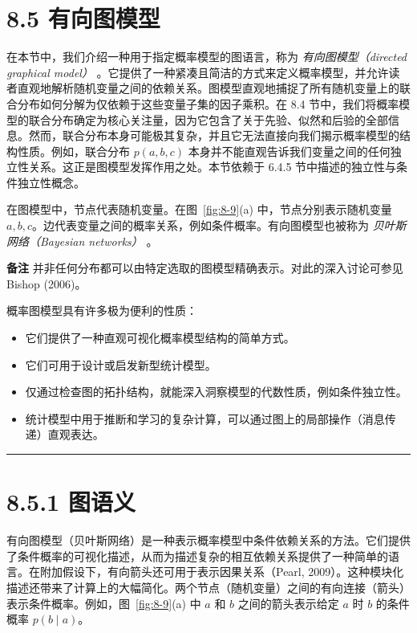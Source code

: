 \section*{8.5 有向图模型}
\label{sec:8.5}

在本节中，我们介绍一种用于指定概率模型的图语言，称为 \emph{有向图模型（directed graphical model）} 。它提供了一种紧凑且简洁的方式来定义概率模型，并允许读者直观地解析随机变量之间的依赖关系。图模型直观地捕捉了所有随机变量上的联合分布如何分解为仅依赖于这些变量子集的因子乘积。在 8.4 节中，我们将概率模型的联合分布确定为核心关注量，因为它包含了关于先验、似然和后验的全部信息。然而，联合分布本身可能极其复杂，并且它无法直接向我们揭示概率模型的结构性质。例如，联合分布 $ p(a, b, c) $ 本身并不能直观告诉我们变量之间的任何独立性关系。这正是图模型发挥作用之处。本节依赖于 6.4.5 节中描述的独立性与条件独立性概念。

在图模型中，节点代表随机变量。在图~\ref{fig:8-9}(a) 中，节点分别表示随机变量 $ a, b, c $。边代表变量之间的概率关系，例如条件概率。有向图模型也被称为 \emph{贝叶斯网络（Bayesian networks）} 。

\begin{notebox}
\textbf{备注} 并非任何分布都可以由特定选取的图模型精确表示。对此的深入讨论可参见 Bishop (2006)。
\end{notebox}

概率图模型具有许多极为便利的性质：

\begin{itemize}
\item 它们提供了一种直观可视化概率模型结构的简单方式。
\item 它们可用于设计或启发新型统计模型。
\item 仅通过检查图的拓扑结构，就能深入洞察模型的代数性质，例如条件独立性。
\item 统计模型中用于推断和学习的复杂计算，可以通过图上的局部操作（消息传递）直观表达。
\end{itemize}

\medskip\hrule\medskip

\section*{8.5.1 图语义}

有向图模型（贝叶斯网络）是一种表示概率模型中条件依赖关系的方法。它们提供了条件概率的可视化描述，从而为描述复杂的相互依赖关系提供了一种简单的语言。在附加假设下，有向箭头还可用于表示因果关系（Pearl, 2009）。这种模块化描述还带来了计算上的大幅简化。两个节点（随机变量）之间的有向连接（箭头）表示条件概率。例如，图~\ref{fig:8-9}(a) 中 $ a $ 和 $ b $ 之间的箭头表示给定 $ a $ 时 $ b $ 的条件概率 $ p(b \mid a) $。


